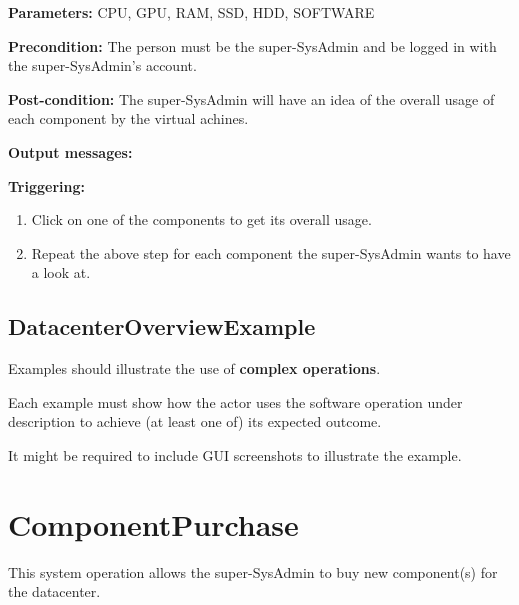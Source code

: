\begin{description}

\item \textbf{Parameters:} CPU, GPU, RAM, SSD, HDD, SOFTWARE
\item \textbf{Precondition:} The person must be the super-SysAdmin and be logged
in with the super-SysAdmin's account.
\item \textbf{Post-condition:} The super-SysAdmin will have an idea of the
overall usage of each component by the virtual achines.
\item \textbf{Output messages:}

\item \textbf{Triggering:}
\begin{enumerate}
\item Click on one of the components to get its overall usage.
\item Repeat the above step for each component the super-SysAdmin wants to have a
look at.
\end{enumerate}

 
\end{description}

 
\subsection{DatacenterOverviewExample}
Examples should illustrate the use of \textbf{complex operations}.

Each example must show how the actor uses the software operation under
description to achieve (at least one of) its expected outcome.

It might be required to include GUI screenshots to illustrate the example.






\section{ComponentPurchase}
\label{operation:componentpurchase}
This system operation allows the super-SysAdmin to buy new component(s) for the
datacenter.

